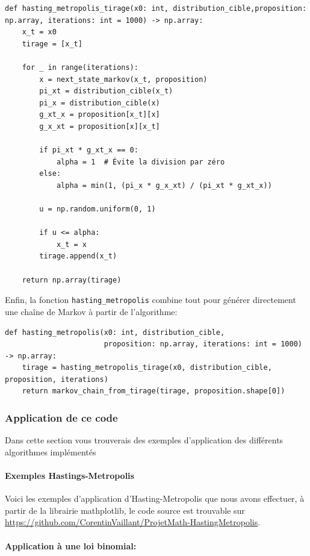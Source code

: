 \documentclass{article}
\begin{document}
\begin{verbatim}
def hasting_metropolis_tirage(x0: int, distribution_cible,proposition: np.array, iterations: int = 1000) -> np.array:
    x_t = x0
    tirage = [x_t]

    for _ in range(iterations):
        x = next_state_markov(x_t, proposition)
        pi_xt = distribution_cible(x_t)
        pi_x = distribution_cible(x)
        g_xt_x = proposition[x_t][x]
        g_x_xt = proposition[x][x_t]

        if pi_xt * g_xt_x == 0:
            alpha = 1  # Évite la division par zéro
        else:
            alpha = min(1, (pi_x * g_x_xt) / (pi_xt * g_xt_x))

        u = np.random.uniform(0, 1)

        if u <= alpha:
            x_t = x
        tirage.append(x_t)

    return np.array(tirage)
\end{verbatim}

Enfin, la fonction \texttt{hasting\_metropolis} combine tout pour générer directement une chaîne de Markov à partir de l'algorithme:

\begin{verbatim}
def hasting_metropolis(x0: int, distribution_cible, 
                       proposition: np.array, iterations: int = 1000) -> np.array:
    tirage = hasting_metropolis_tirage(x0, distribution_cible, proposition, iterations)
    return markov_chain_from_tirage(tirage, proposition.shape[0])
\end{verbatim}

\newpage
\subsubsection{Application de ce code}

Dans cette section vous trouverais des exemples d'application des différents algorithmes implémentés 

\paragraph{Exemples Hastings-Metropolis}

Voici les exemples d'application d'Hasting-Metropolis que nous avons effectuer, à partir de la librairie mathplotlib, le code source est trouvable sur \url{https://github.com/CorentinVaillant/ProjetMath-HastingMetropolis}.

\paragraph{Application à une loi binomial:}
\end{document}
